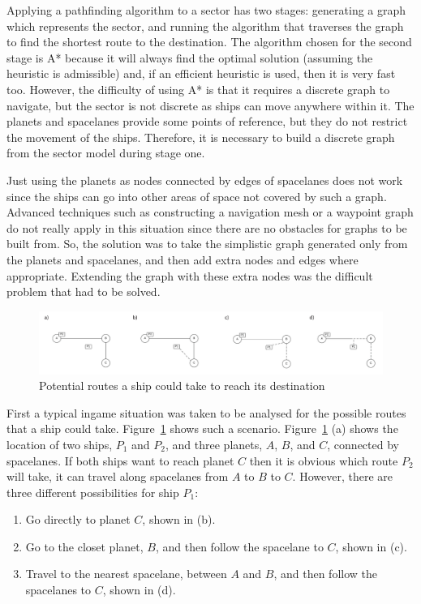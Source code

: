 Applying a pathfinding algorithm to a sector has two stages: generating a graph which represents the sector, and running the algorithm that traverses the graph to find the shortest route to the destination. The algorithm chosen for the second stage is A* because it will always find the optimal solution (assuming the heuristic is admissible) and, if an efficient heuristic is used, then it is very fast too. However, the difficulty of using A* is that it requires a discrete graph to navigate, but the sector is not discrete as ships can move anywhere within it. The planets and spacelanes provide some points of reference, but they do not restrict the movement of the ships. Therefore, it is necessary to build a discrete graph from the sector model during stage one.

Just using the planets as nodes connected by edges of spacelanes does not work since the ships can go into other areas of space not covered by such a graph. Advanced techniques such as constructing a navigation mesh or a waypoint graph do not really apply in this situation since there are no obstacles for graphs to be built from. So, the solution was to take the simplistic graph generated only from the planets and spacelanes, and then add extra nodes and edges where appropriate. Extending the graph with these extra nodes was the difficult problem that had to be solved.

\begin{figure}[h!]
	\includegraphics{res/pathfinding/PathFindingExample.pdf}
	\caption{Potential routes a ship could take to reach its destination}
	\label{fig:pathfindingexample}
\end{figure}

First a typical ingame situation was taken to be analysed for the possible routes that a ship could take. Figure~\ref{fig:pathfindingexample} shows such a scenario. Figure~\ref{fig:pathfindingexample} (a) shows the location of two ships, $P_1$ and $P_2$, and three planets, $A$, $B$, and $C$, connected by spacelanes. If both ships want to reach planet $C$ then it is obvious which route $P_2$ will take, it can travel along spacelanes from $A$ to $B$ to $C$. However, there are three different possibilities for ship $P_1$:

\begin{enumerate}
	\item Go directly to planet $C$, shown in (b).
	\item Go to the closet planet, $B$, and then follow the spacelane to $C$, shown in (c).
	\item Travel to the nearest spacelane, between $A$ and $B$, and then follow the spacelanes to $C$, shown in (d).
\end{enumerate}

